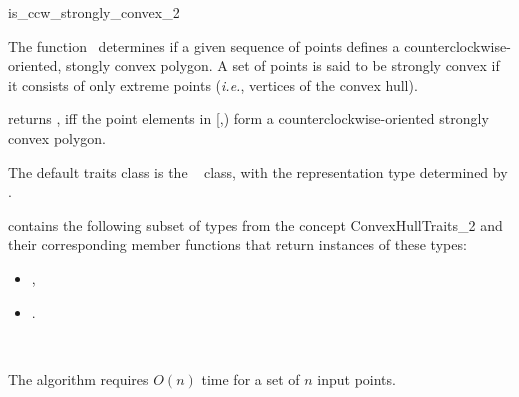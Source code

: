 

\begin{ccRefFunction}{is_ccw_strongly_convex_2}  

\ccDefinition
  
The function \ccRefName\ determines if a given sequence of points defines
a counterclockwise-oriented, stongly convex polygon.  
A set of points is said to be strongly convex 
if it consists of only extreme points
(\textit{i.e.}, vertices of the convex hull).


           {returns , iff the point elements in 
            [,)
            form a counterclockwise-oriented strongly convex polygon.
           }


The default traits class  is the \cgal\ 
 class,
with the representation type determined by .

 contains the following subset of types from
the concept ConvexHullTraits\_2 and their corresponding member
functions that return instances of these types:
\begin{itemize}
   \item {}, 
   \item {}.
\end{itemize}


\ccSeeAlso

 \\


\ccImplementation

The algorithm requires $O(n)$ time for a set of $n$ input points.


\end{ccRefFunction}



